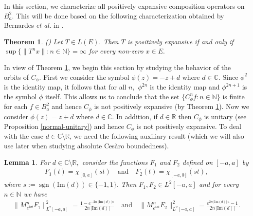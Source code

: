 \documentclass[11pt]{amsart}%
\numberwithin{equation}{section}
\theoremstyle{plain}
\newtheorem{lem}[thm]{Lemma}
\newtheorem{teo}{Theorem}
\theoremstyle{definition}
\theoremstyle{definition}
\begin{document}
In this section, we characterize all positively expansive composition operators on $B_a^2$. This will be done based on the following characterization obtained by Bernardes \textit{et al.} in \cite{Bernardes}.

\begin{teo}\label{positively} \normalfont  (\cite[Proposition~19]{Bernardes}) Let $T\in L(E).$ Then $T$ is positively expansive if and only if $\sup\{\|T^nx\|:n\in \mathbb{N}\}=\infty$ for every non-zero $x\in E.$ 
\end{teo}

In view of Theorem \ref{positively}, we begin this section by studying the behavior of the orbits of $C_{\phi}.$ First we consider the symbol $\phi(z)=-z+d$ where $d\in \mathbb{C}.$ Since $\phi^2$ is the identity map, it follows that for all $n,$  $\phi^{2n}$ is the identity map and $\phi^{2n+1}$ is the symbol $\phi$ itself. This allows us to conclude that the set $\{C^n_{\phi}f:n\in \mathbb{N}\}$ is finite for each $f\in B^2_a$ and hence $C_{\phi}$ is not positively expansive (by Theorem \ref{positively}). Now we consider $\phi(z)=z+d$ where $d\in \mathbb{C}.$ In addition, if $d\in \mathbb{R}$ then $C_{\phi}$ is unitary (see Proposition \ref{normal-unitary}) and hence $C_{\phi}$ is not positively expansive. To deal with the case $d\in\mathbb{C}\setminus\mathbb{R}$, we need the following auxiliary result (which we will also use later when studying absolute Ces\`aro boundedness).


\begin{lem}\label{witness lemma}  For $d\in\mathbb{C}\setminus\mathbb{R},$  consider the functions $F_1$ and $F_2$ defined on $[-a,a]$ by
\begin{align*}
F_1(t)=\chi_{[0,a]}(st) \quad \text{and} \quad F_2(t)=\chi_{[-a,0]}(st),
\end{align*}
where $s:=\operatorname{sgn}(\mathrm{Im}(d))\in\{-1,1\}.$ Then $F_1,F_2\in L^2[-a,a]$ and for every $n\in \mathbb{N}$ we have 
\begin{align}\label{non-expansive}
\|M_{e^{idt}}^nF_1\|_{L^2[-a,a]}^{2}=\frac{1-e^{-2n\,|\mathrm{Im}(d)|\,a}}{2n\,|\mathrm{Im}(d)|} \quad \text{and} \quad \|M_{e^{idt}}^nF_2\|_{L^2[-a,a]}^{2}=\frac{e^{2n\,|\mathrm{Im}(d)|\,a}-1}{2n\,|\mathrm{Im}(d)|}.
\end{align}
\end{lem}
\end{document}
